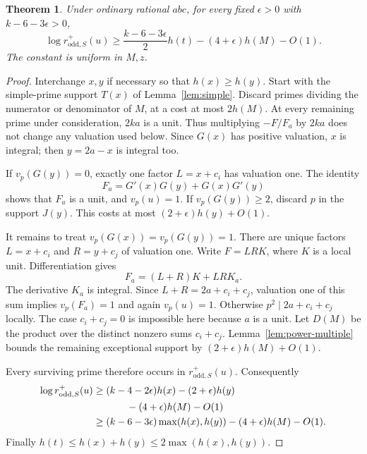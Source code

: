 \documentclass[11pt,a4paper]{article}
\newtheorem{theorem}{Theorem}[section]
\begin{document}
\begin{theorem}\label{thm:derivative-height}
Under ordinary rational $abc$, for every fixed $\epsilon>0$ with
$k-6-3\epsilon>0$,
\begin{equation}\label{eq:derivative-height}
 \log r^+_{\mathrm{odd},S}(u)
 \ge \frac{k-6-3\epsilon}{2}h(t)
                  -(4+\epsilon)h(M)-O(1).
\end{equation}
The constant is uniform in $M,z$.
\end{theorem}
\begin{proof}
Interchange $x,y$ if necessary so that $h(x)\ge h(y)$.
Start with the simple-prime support $T(x)$ of Lemma~\ref{lem:simple}.
Discard primes dividing the numerator or denominator of $M$, at a
cost at most $2h(M)$. At every remaining prime under consideration,
$2ka$ is a unit. Thus multiplying $-F/F_a$ by $2ka$ does not change
any valuation used below. Since $G(x)$ has positive valuation, $x$ is integral;
then $y=2a-x$ is integral too.

If $v_p(G(y))=0$, exactly one factor $L=x+c_i$ has valuation one.
The identity
\[
                         F_a=G'(x)G(y)+G(x)G'(y)
\]
shows that $F_a$ is a unit, and $v_p(u)=1$.
If $v_p(G(y))\ge2$, discard $p$ in the support $J(y)$.
This costs at most $(2+\epsilon)h(y)+O(1)$.

It remains to treat $v_p(G(x))=v_p(G(y))=1$.
There are unique factors $L=x+c_i$ and $R=y+c_j$ of valuation one.
Write $F=LRK$, where $K$ is a local unit. Differentiation gives
\[
                       F_a=(L+R)K+LRK_a.
\]
The derivative $K_a$ is integral. Since
$L+R=2a+c_i+c_j$, valuation one of this sum implies
$v_p(F_a)=1$ and again $v_p(u)=1$.
Otherwise $p^2\mid 2a+c_i+c_j$ locally.
The case $c_i+c_j=0$ is impossible here because $a$ is a unit.
Let $D(M)$ be the product over the distinct nonzero sums $c_i+c_j$.
Lemma~\ref{lem:power-multiple} bounds the remaining exceptional
support by $(2+\epsilon)h(M)+O(1)$.

Every surviving prime therefore occurs in
$r^+_{\mathrm{odd},S}(u)$. Consequently
\begin{align*}
 \log r^+_{\mathrm{odd},S}(u)
 &\ge(k-4-2\epsilon)h(x)-(2+\epsilon)h(y)\\
 &\hspace{12mm}-(4+\epsilon)h(M)-O(1)\\
 &\ge(k-6-3\epsilon)\max(h(x),h(y))
                  -(4+\epsilon)h(M)-O(1).
\end{align*}
Finally $h(t)\le h(x)+h(y)\le2\max(h(x),h(y))$.
\end{proof}
\end{document}
